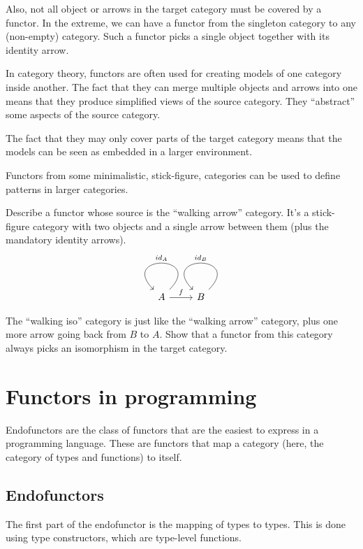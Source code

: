 \documentclass[DaoFP]{subfiles}
\begin{document}
Also, not all object or arrows in the target category must be covered by a functor. In the extreme, we can have a functor from the singleton category to any (non-empty) category. Such a functor picks a single object together with its identity arrow.

In category theory, functors are often used for creating models of one category inside another. The fact that they can merge multiple objects and arrows into one means that they produce simplified views of the source category. They ``abstract'' some aspects of the source category.

The fact that they may only cover parts of the target category means that the models can be seen as embedded in a larger environment.

Functors from some minimalistic, stick-figure, categories can be used to define patterns in larger categories.

\begin{exercise}
Describe a functor whose source is the ``walking arrow'' category. It's a stick-figure category with two objects and a single arrow between them (plus the mandatory identity arrows).
\[
 \begin{tikzcd}
 A 
  \arrow[loop,  "id_A"']
\arrow[r, "f"]
 & B
  \arrow[loop, "id_{B}"']
  \end{tikzcd}
\]
\end{exercise}
\begin{exercise}
The ``walking iso'' category is just like the ``walking arrow'' category, plus one more arrow going back from $B$ to $A$. Show that a functor from this category always picks an isomorphism in the target category. 
\end{exercise}

\section{Functors in programming}

Endofunctors are the class of functors that are the easiest to express in a programming language. These are functors that map a category (here, the category of types and functions) to itself. 

\subsection{Endofunctors}
The first part of the endofunctor is the mapping of types to types. This is done using type constructors, which are type-level functions. 
\end{document}
